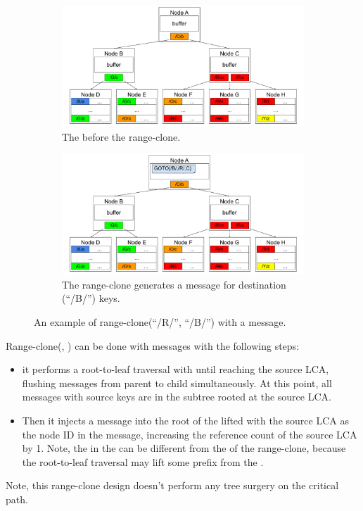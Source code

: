 \begin{figure}
    \begin{subfigure}{\textwidth}
        \centering
        \includegraphics[width=.9\linewidth]{fig/rr-1}
        \caption{\label{subfig:goto-1} The \bet before the range-clone.}
    \end{subfigure}
    \begin{subfigure}{\textwidth}
        \centering
        \includegraphics[width=.9\linewidth]{fig/goto-2}
        \caption{\label{subfig:goto-2} The range-clone generates a \goto message
            for destination (``/B/'') keys.}
    \end{subfigure}
    \caption[A range-clone example with a \goto message]{\label{fig:goto}
        An example of range-clone(``/R/'', ``/B/'') with a \goto message.}
\end{figure}

Range-clone(\spre, \dpre) can be done with \goto messages with the following
steps:
\begin{itemize}
\item it performs a root-to-leaf traversal with \spre until reaching the source
LCA, flushing messages from parent to child simultaneously.
At this point, all messages with source keys are in the subtree rooted at the
source LCA.
\item Then it injects a \goto message into the root of the lifted \bedag with
the source LCA as the node ID in the \goto message, increasing the reference
count of the source LCA by 1.
Note, the \spre in the \goto can be different from the \spre of the range-clone,
because the root-to-leaf traversal may lift some prefix from the \spre.
\end{itemize}
Note, this range-clone design doesn't perform any tree surgery on the critical
path.

